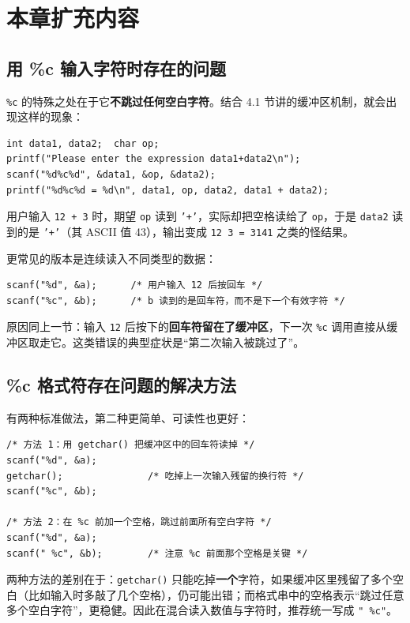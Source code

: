 \section{本章扩充内容}

\subsection{用 \%c 输入字符时存在的问题}

\texttt{\%c} 的特殊之处在于它\textbf{不跳过任何空白字符}。结合 4.1 节讲的缓冲区机制，就会出现这样的现象：

\begin{lstlisting}
int data1, data2;  char op;
printf("Please enter the expression data1+data2\n");
scanf("%d%c%d", &data1, &op, &data2);
printf("%d%c%d = %d\n", data1, op, data2, data1 + data2);
\end{lstlisting}

用户输入 \texttt{12 + 3} 时，期望 \texttt{op} 读到 \texttt{'+'}，实际却把空格读给了 \texttt{op}，于是 \texttt{data2} 读到的是 \texttt{'+'}（其 ASCII 值 43），输出变成 \texttt{12 3 = 3141} 之类的怪结果。

更常见的版本是连续读入不同类型的数据：

\begin{lstlisting}
scanf("%d", &a);      /* 用户输入 12 后按回车 */
scanf("%c", &b);      /* b 读到的是回车符，而不是下一个有效字符 */
\end{lstlisting}

原因同上一节：输入 \texttt{12} 后按下的\textbf{回车符留在了缓冲区}，下一次 \texttt{\%c} 调用直接从缓冲区取走它。这类错误的典型症状是“第二次输入被跳过了”。

\subsection{\%c 格式符存在问题的解决方法}

有两种标准做法，第二种更简单、可读性也更好：

\begin{lstlisting}
/* 方法 1：用 getchar() 把缓冲区中的回车符读掉 */
scanf("%d", &a);
getchar();               /* 吃掉上一次输入残留的换行符 */
scanf("%c", &b);

/* 方法 2：在 %c 前加一个空格，跳过前面所有空白字符 */
scanf("%d", &a);
scanf(" %c", &b);        /* 注意 %c 前面那个空格是关键 */
\end{lstlisting}

两种方法的差别在于：\texttt{getchar()} 只能吃掉\textbf{一个}字符，如果缓冲区里残留了多个空白（比如输入时多敲了几个空格），仍可能出错；而格式串中的空格表示“跳过任意多个空白字符”，更稳健。因此在混合读入数值与字符时，推荐统一写成 \texttt{" \%c"}。

